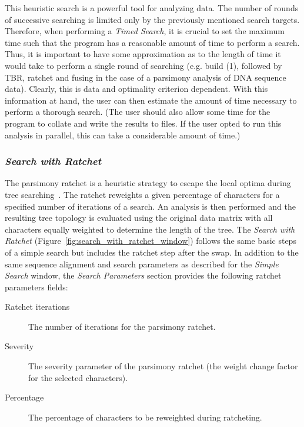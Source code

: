 {This heuristic search is a powerful tool for analyzing data. The number of rounds of successive searching is limited only by the previously mentioned search targets. Therefore, when performing a \emph{Timed Search}, it is crucial to set the maximum time such that the program has a reasonable amount of time to perform a search.  Thus, it is important to have some approximation as to the length of time it would take to perform a single round of searching (e.g. build (1), followed by TBR, ratchet and fusing in the case of a parsimony analysis of DNA sequence data).  Clearly, this is data and optimality criterion dependent.  With this information at hand, the user can then estimate the amount of time necessary to perform a thorough search.  (The user should also allow some time for the program to collate and write the results to files.  If the user opted to run this analysis in parallel, this can take a considerable amount of time.)

\subsubsection*{\emph{Search with Ratchet}}

The parsimony ratchet is a heuristic strategy to escape the local optima during tree searching~\cite{Nixon1999}. The ratchet reweights a given percentage of characters for a specified number of iterations of a search. An analysis is then performed and the resulting tree topology is evaluated using the original data matrix with all characters equally weighted to determine the length of the tree. The \emph{Search with Ratchet} (Figure~\ref{fig:search_with_ratchet_window}) follows the same basic steps of a simple search but includes the ratchet step after the swap. In addition to the same sequence alignment and search parameters as described for the \emph{Simple Search} window, the \emph{Search Parameters} section provides the following ratchet parameters fields:

\begin{description}
    \item[Ratchet iterations] The number of iterations for the parsimony
        ratchet.
    \item[Severity] The severity parameter of the parsimony ratchet (the weight
        change factor for the selected characters).
    \item[Percentage] The percentage of characters to be reweighted during ratcheting.
\end{description}

}
